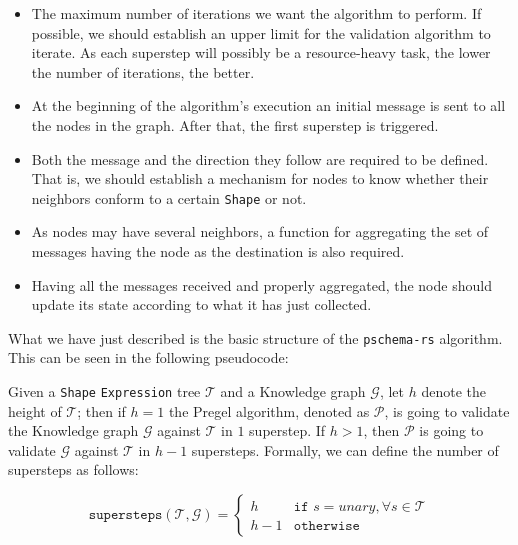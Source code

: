 \begin{itemize}
    \itemsep0.5em
    \item The maximum number of iterations we want the algorithm to perform. If possible, we should establish an upper limit for the validation algorithm to iterate. As each superstep will possibly be a resource-heavy task, the lower the number of iterations, the better.
    \item At the beginning of the algorithm's execution an initial message is sent to all the nodes in the graph. After that, the first superstep is triggered.
    \item Both the message and the direction they follow are required to be defined. That is, we should establish a mechanism for nodes to know whether their neighbors conform to a certain \texttt{Shape} or not.
    \item As nodes may have several neighbors, a function for aggregating the set of messages having the node as the destination is also required.
    \item Having all the messages received and properly aggregated, the node should update its state according to what it has just collected.
\end{itemize}

What we have just described is the basic structure of the \texttt{pschema-rs} algorithm. This can be seen in the following pseudocode:

\begin{pseudocode}
    
\end{pseudocode}

\begin{theorem}
    Given a \texttt{Shape} \texttt{Expression} tree $\mathcal{T}$ and a Knowledge graph $\mathcal{G}$, let $h$ denote the height of $\mathcal{T}$; then if $h = 1$ the Pregel algorithm, denoted as $\mathcal{P}$, is going to validate the Knowledge graph $\mathcal{G}$ against $\mathcal{T}$ in $1$ superstep. If $h > 1$, then $\mathcal{P}$ is going to validate $\mathcal{G}$ against $\mathcal{T}$ in $h - 1$ supersteps. Formally, we can define the number of supersteps as follows:

    \begin{equation}
        \texttt{supersteps}(\mathcal{T}, \mathcal{G}) =
        \begin{cases}
            h     & \texttt{if } s = unary, \forall s \in \mathcal{T} \\
            h - 1 & \texttt{otherwise}
        \end{cases}
    \end{equation}
\end{theorem}

